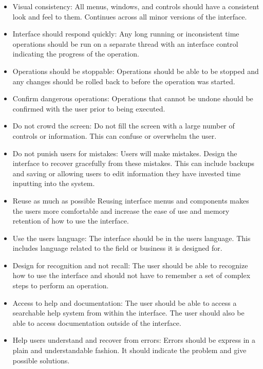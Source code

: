 \documentclass[12pt]{article}
\begin{document}
\begin{itemize}

\item Visual consistency:  All menus, windows, and controls should have a
consistent look and feel to them.  Continues across all minor versions
of the interface.

\item Interface should respond quickly:  Any long running or inconsistent 
time operations should be run on a separate thread with an interface control
indicating the progress of the operation.

\item Operations should be stoppable:  Operations should be able to be
stopped and any changes should be rolled back to before the operation
was started.

\item Confirm dangerous operations:  Operations that cannot be undone 
should be confirmed with the user prior to being executed.

\item Do not crowd the screen:  Do not fill the screen with a large number
of controls or information.  This can confuse or overwhelm the user.

\item Do not punish users for mistakes:  Users will make mistakes.  Design
the interface to recover gracefully from these mistakes.  This can include
backups and saving or allowing users to edit information they have
invested time inputting into the system.

\item Reuse as much as possible  Reusing interface menus and components
makes the users more comfortable and increase the ease of use and memory 
retention of how to use the interface.

\item Use the users language:  The interface should be in the users
language.  This includes language related to the field or business it is
designed for.

\item Design for recognition and not recall:  The user should be able to
recognize how to use the interface and should not have to remember a set 
of complex steps to perform an operation.

\item Access to help and documentation:  The user should be able to access 
a searchable help system from within the interface.  The user should also
be able to access documentation outside of the interface.  

\item Help users understand and recover from errors:  Errors should be
express in a plain and understandable fashion.  It should indicate the 
problem and give possible solutions.

\end{itemize}
\end{document}
